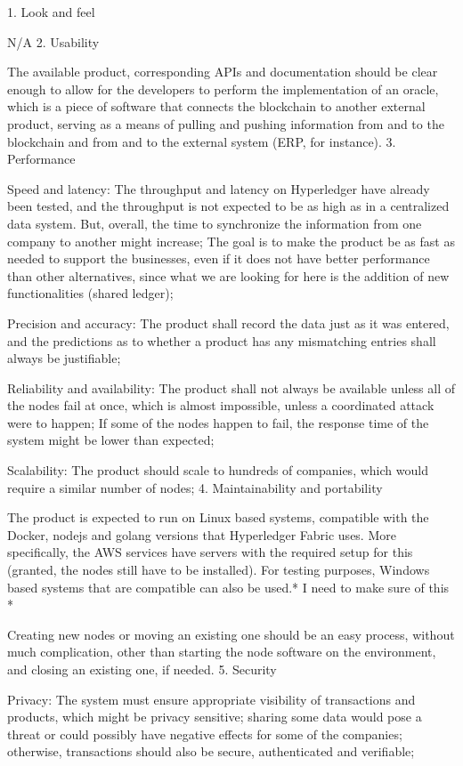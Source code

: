 	1. Look and feel
		\par N/A
	2. Usability
		\par The available product, corresponding APIs  and documentation should be clear enough to allow for the developers to perform the implementation of an oracle, which is a piece of software that connects the blockchain to another external product, serving as a means of pulling and pushing information from and to the blockchain and from and to the external system (ERP, for instance).
	3. Performance
		\par Speed and latency: The throughput and latency on Hyperledger have already been tested, and the throughput is not expected to be as high as in a centralized data system. But, overall, the time to synchronize the information from one company to another might increase; The goal is to make the product be as fast as needed to support the businesses, even if it does not have better performance than other alternatives, since what we are looking for here is the addition of new functionalities (shared ledger);
		\par Precision and accuracy: The product shall record the data just as it was entered, and the predictions as to whether a product has any mismatching entries shall always be justifiable;
		\par Reliability and availability: The product shall not always be available unless all of the nodes fail at once, which is almost impossible, unless a coordinated attack were to happen; If some of the nodes happen to fail, the response time of the system might be lower than expected;
		\par Scalability: The product should scale to hundreds of companies, which would require a similar number of nodes;
	4. Maintainability and portability
		\par The product is expected to run on Linux based systems, compatible with the Docker, nodejs and golang versions that Hyperledger Fabric uses. More specifically, the AWS services have servers with the required setup for this (granted, the nodes still have to be installed). For testing purposes, Windows based systems that are compatible can also be used.* I need to make sure of this *
		\par Creating new nodes or moving an existing one should be an easy process, without much complication, other than starting the node software on the environment, and closing an existing one, if needed.
	5. Security
		\par Privacy: The system must ensure appropriate visibility of transactions and products, which might be privacy sensitive; sharing some data would pose a threat or could possibly have negative effects for some of the companies; otherwise, transactions should also be secure, authenticated and verifiable;
